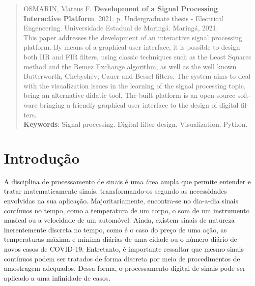 \documentclass[12pt,a4paper]{report}
\begin{document}
\begin{otherlanguage}{english}
  \begin{abstract}
    OSMARIN, Mateus F. \textbf{Development of a Signal Processing Interactive Platform}. 2021.
    \pageref{LastPage} p. Undergraduate thesis - Electrical Engeneering. Universidade Estadual de Maringá.
    Maringá, 2021.\\

    This paper addresses the development of an interactive signal processing platform. By means of a graphical
    user interface, it is possible to design both IIR and FIR filters, using classic techniques such as the Least
    Squares method and the Remez Exchange algorithm, as well as the well known Butterworth, Chebyshev, Cauer and
    Bessel filters. The system aims to deal with the visualization issues in the learning of the signal
    processing topic, being an alternative didatic tool. The built platform is an open-source software bringing
    a friendly graphical user interface to the design of digital filters.\\

    \textbf{Keywords}: Signal processing. Digital filter design. Visualization. Python.
  \end{abstract}
\end{otherlanguage}

{
  \center
  \listoffigures
  \pagestyle{empty}
  \clearpage
}

{
  \center
  \tableofcontents
  \thispagestyle{empty}
  \clearpage
}

\thispagestyle{empty}
\clearpage
\onehalfspacing

\chapter{Introdução}
  A disciplina de processamento de sinais é uma área ampla que permite entender e tratar matematicamente
  sinais, transformando-os segundo as necessidades envolvidas na sua aplicação. Majoritariamente, encontra-se
  no dia-a-dia sinais contínuos no tempo, como a temperatura de um corpo, o som de um instrumento musical ou a
  velocidade de um automóvel. Ainda, existem sinais de natureza inerentemente discreta no tempo, como é o caso
  do preço de uma ação, as temperaturas máxima e mínima diárias de uma cidade ou o número diário de novos casos
  de COVID-19. Entretanto, é importante ressaltar que mesmo sinais contínuos podem ser tratados de forma discreta
  por meio de procedimentos de amostragem adequados. Dessa forma, o processamento digital de sinais pode ser
  aplicado a uma infinidade de casos.
\end{document}
